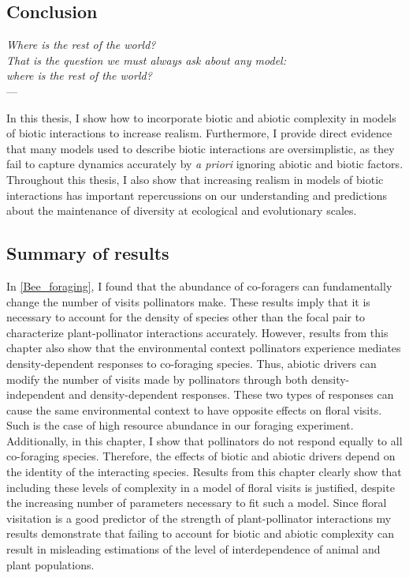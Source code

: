 \begin{refsection}
\chapter{Conclusion} %
\label{Conclusion}
\begin{flushright}{\slshape
    Where is the rest of the world? \\
    That is the question we must always ask about any model: \\
    where is the rest of the world?
    } \\ \medskip
    --- \textcite{levins2006strategies}
\end{flushright}

\bigskip

In this thesis, I show how to incorporate biotic and abiotic complexity in models of biotic interactions to increase realism. Furthermore, I provide direct evidence that many models used to describe biotic interactions are oversimplistic, as they fail to capture dynamics accurately by \textit{a priori} ignoring abiotic and biotic factors. Throughout this thesis, I also show that increasing realism in models of biotic interactions has important repercussions on our understanding and predictions about the maintenance of diversity at ecological and evolutionary scales.

\section*{Summary of results}
In \autoref{Bee_foraging}, I found that the abundance of co-foragers can fundamentally change the number of visits pollinators make. These results imply that it is necessary to account for the density of species other than the focal pair to characterize plant-pollinator interactions accurately. However, results from this chapter also show that the environmental context pollinators experience mediates density-dependent responses to co-foraging species. Thus, abiotic drivers can modify the number of visits made by pollinators through both density-independent and density-dependent responses. These two types of responses can cause the same environmental context to have opposite effects on floral visits. Such is the case of high resource abundance in our foraging experiment. Additionally, in this chapter, I show that pollinators do not respond equally to all co-foraging species. Therefore, the effects of biotic and abiotic drivers depend on the identity of the interacting species. Results from this chapter clearly show that including these levels of complexity in a model of floral visits is justified, despite the increasing number of parameters necessary to fit such a model. Since floral visitation is a good predictor of the strength of plant-pollinator interactions \citep{vazquez2005interaction, vazquez_strength_2012} my results demonstrate that failing to account for biotic and abiotic complexity can result in misleading estimations of the level of interdependence of animal and plant populations.



\end{refsection}
